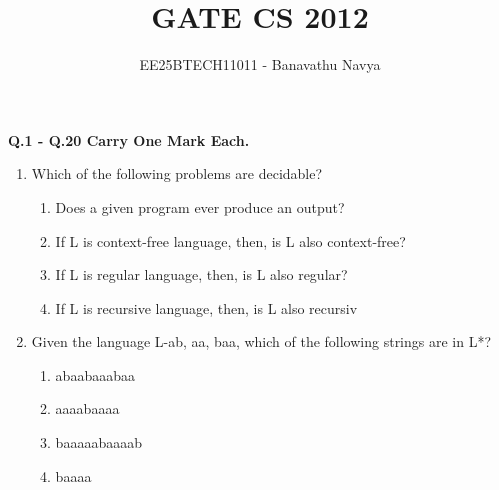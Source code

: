 \documentclass[journal]{IEEEtran}
\numberwithin{equation}{enumi}
\numberwithin{figure}{enumi}
\begin{document}

\vspace{3cm}

\title{GATE CS 2012}
\author{EE25BTECH11011 - Banavathu Navya}
\maketitle

\begin{center}
 \textbf{Q.1 - Q.20 Carry One Mark Each.}
\end{center}
\begin{enumerate}
\item Which of the following problems are decidable?
\begin{enumerate}
    \item Does a given program ever produce an output?
    \item If L is context-free language, then, is L also context-free?
    \item If L is regular language, then, is L also regular?
    \item If L is recursive language, then, is L also recursiv
\end{enumerate}
\begin{enumerate}
\end{enumerate}

\item Given the language L-{ab, aa, baa}, which of the following strings are in L*? 
\begin{enumerate}
   \item abaabaaabaa
   \item aaaabaaaa
   \item baaaaabaaaab
   \item baaaa
\end{enumerate}
\begin{enumerate}
\end{enumerate}


\end{enumerate}
\end{document}
